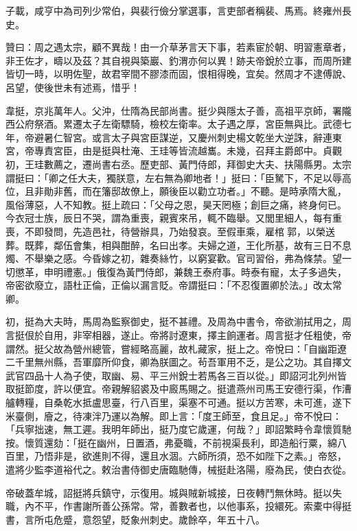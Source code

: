 \begin{pinyinscope}
 子載，咸亨中為司列少常伯，與裴行儉分掌選事，言吏部者稱裴、馬焉。終雍州長史。



 贊曰：周之遇太宗，顧不異哉！由一介草茅言天下事，若素宦於朝、明習憲章者，非王佐才，疇以及茲？其自視與築巖、釣渭亦何以異！跡夫帝銳於立事，而周所建皆切一時，以明佐聖，故君宰間不膠漆而固，恨相得晚，宜矣。然周才不逮傅說、呂望，使後世未有述焉，惜乎！



 韋挺，京兆萬年人。父沖，仕隋為民部尚書。挺少與隱太子善，高祖平京師，署隴西公府祭酒。累遷太子左衛驃騎，檢校左衛率。太子遇之厚，宮臣無與比。武德七年，帝避暑仁智宮。或言太子與宮臣謀逆，又慶州刺史楊文乾坐大逆誅，辭連東宮，帝專責宮臣，由是挺與杜淹、王珪等皆流越巂。未幾，召拜主爵郎中。貞觀初，王珪數薦之，遷尚書右丞。歷吏部、黃門侍郎，拜御史大夫、扶陽縣男。太宗謂挺曰：「卿之任大夫，獨朕意，左右無為卿地者！」挺曰：「臣駑下，不足以辱高位，且非勛非舊，而在籓邸故僚上，願後臣以勸立功者。」不聽。是時承隋大亂，風俗薄惡，人不知教。挺上疏曰：「父母之恩，昊天罔極；創巨之痛，終身何已。今衣冠士族，辰日不哭，謂為重喪，親賓來吊，輒不臨舉。又閭里細人，每有重喪，不即發問，先造邑社，待營辦具，乃始發哀。至假車乘，雇棺郭，以榮送葬。既葬，鄰伍會集，相與酣醉，名曰出孝。夫婦之道，王化所基，故有三日不息燭、不舉樂之感。今昏嫁之初，雜奏絲竹，以窮宴歡。官司習俗，弗為條禁。望一切懲革，申明禮憲。」俄復為黃門侍郎，兼魏王泰府事。時泰有寵，太子多過失，帝密欲廢立，語杜正倫，正倫以漏言貶。帝謂挺曰：「不忍復置卿於法。」改太常卿。



 初，挺為大夫時，馬周為監察御史，挺不甚禮。及周為中書令，帝欲湔拭用之，周言挺佷於自用，非宰相器，遂止。帝將討遼東，擇主餉運者。周言挺才任粗使，帝謂然。挺父故為營州總管，嘗經略高麗，故札藏家，挺上之。帝悅曰：「自幽距遼二千里無州縣，吾軍靡所仰食，卿為朕圖之。茍吾軍用不乏，是公之功。其自擇文武官四品十人為子使，取幽、易、平三州銳士若馬各三百以從。」即詔河北列州皆取挺節度，許以便宜。帝親解貂裘及中廄馬賜之。挺遣燕州司馬王安德行渠，作漕艫轉糧，自桑乾水抵盧思臺，行八百里，渠塞不可通。挺以方苦寒，未可進，遂下米臺側，廥之，待凍泮乃運以為解。即上言：「度王師至，食且足。」帝不悅曰：「兵寧拙速，無工遲。我明年師出，挺乃度它歲運，何哉？」即詔繁畤令韋懷質馳按。懷質還劾：「挺在幽州，日置酒，弗憂職，不前視渠長利，即造船行粟，綿八百里，乃悟非是，欲進則不得，還且水涸。六師所須，恐不如陛下之素。」帝怒，遣將少監李道裕代之。敕治書侍御史唐臨馳傳，械挺赴洛陽，廢為民，使白衣從。



 帝破蓋牟城，詔挺將兵鎮守，示復用。城與賊新城接，日夜轉鬥無休時。挺以失職，內不平，作書謝所善公孫常。常，善數者也，以他事系，投繯死。索橐中得挺書，言所屯危蹙，意怨望，貶象州刺史。歲餘卒，年五十八。




\end{pinyinscope}
